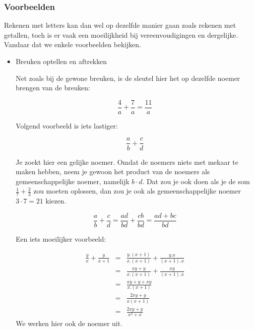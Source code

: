 \subsubsection{Voorbeelden}

\noindent Rekenen met letters kan dan wel op dezelfde manier gaan
zoals rekenen met getallen, toch is er vaak een moeilijkheid bij vereenvoudigingen
en dergelijke. Vandaar dat we enkele voorbeelden bekijken.

\begin{itemize}
	\item{Breuken optellen en aftrekken}
	
	\noindent Net zoals bij de gewone breuken, is de sleutel hier het
	op dezelfde noemer brengen van de breuken:
	
	\begin{equation*}
	{\displaystyle \frac{4}{a}+\frac{7}{a}=\frac{11}{a}}
	\end{equation*}
	
	\noindent Volgend voorbeeld is iets lastiger:
	
	\begin{equation*}
		{\displaystyle \frac{a}{b}+\frac{c}{d}}
	\end{equation*}
	
	\noindent Je zoekt hier een gelijke noemer. Omdat de noemers niets
	met mekaar te maken hebben, neem je gewoon het product van de noemers
	als gemeenschappelijke noemer, namelijk $b\cdot d$. Dat zou je ook
	doen als je de som $\frac{1}{7}+\frac{2}{3}$ zou moeten oplossen,
	dan zou je ook als gemeenschappelijke noemer $3\cdot7=21$ kiezen.
	
	\begin{equation*}
		{\displaystyle \frac{a}{b}+\frac{c}{d}=\frac{ad}{bd}+\frac{cb}{bd}=\frac{ad+bc}{bd}}
	\end{equation*}
		
	\noindent Een iets moeilijker voorbeeld:
	
	\begin{eqnarray*}
		{\displaystyle \frac{y}{x}+\frac{y}{x+1}} & = & {\displaystyle \frac{y.(x+1)}{x.(x+1)}+\frac{y.x}{(x+1).x}} \\
		& = & {\displaystyle \frac{xy+y}{x.(x+1)}+\frac{xy}{(x+1).x}} \\
		& = & {\displaystyle \frac{xy+y+xy}{x.(x+1)}} \\
		& = & {\displaystyle \frac{2xy+y}{x(x+1)}} \\
		& = & {\displaystyle \frac{2xy+y}{x^{2}+x}} 
	\end{eqnarray*}
	We werken hier ook de noemer uit.
	

\end{itemize}
